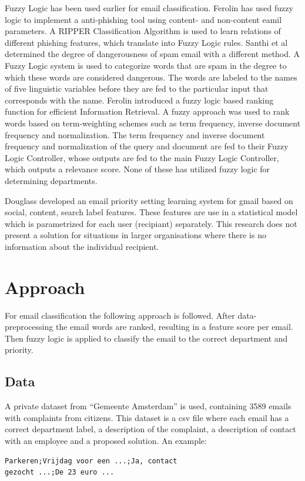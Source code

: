 \documentclass[journal]{IEEEtran}
\begin{document}
Fuzzy Logic has been used earlier for email classification. Ferolin \cite{phishing}
has used fuzzy logic to implement a anti-phishing tool using content- and non-content eamil parameters. A RIPPER Classification Algorithm is used to learn relations of different phishing features, which translate into Fuzzy Logic rules. Santhi et al \cite{spam} determined the degree of dangerousness of spam email with a different method. A Fuzzy Logic system is used to categorize words that are spam in the degree to which these words are considered dangerous. The words are labeled to the names of five linguistic variables before they are fed to the particular input that corresponds with the name. Ferolin \cite{ranking} introduced a fuzzy logic based ranking function for efficient Information Retrieval. A fuzzy approach was used to rank words based on term-weighting schemes such as term frequency, inverse document frequency and normalization. The term frequency and inverse document frequency and normalization of the query and document are fed to their Fuzzy Logic Controller, whose outputs are fed to the main Fuzzy Logic Controller, which outputs a relevance score. None of these has utilized fuzzy logic for determining departments.

Douglass \cite{ranking} developed an email priority setting learning system for gmail based on social, content, search label features. These features are use in a statistical model which is parametrized for each user (recipiant) separately. This research does not present a solution for situations in larger organisations where there is no information about the individual recipient.

\section{Approach}
For email classification the following approach is followed. After data-preprocessing the email words are ranked, resulting in a feature score per email. Then fuzzy logic is applied to classify the email to the correct department and priority.

\subsection{Data}

A private dataset from ``Gemeente Amsterdam'' is used, containing 3589 emails with complaints from citizens.
This dataset is a csv file where each email has a correct department label, a description of the complaint, a description of contact with an employee and a proposed solution.
An example:
\begin{lstlisting}
Parkeren;Vrijdag voor een ...;Ja, contact
gezocht ...;De 23 euro ...
\end{lstlisting}
\end{document}
